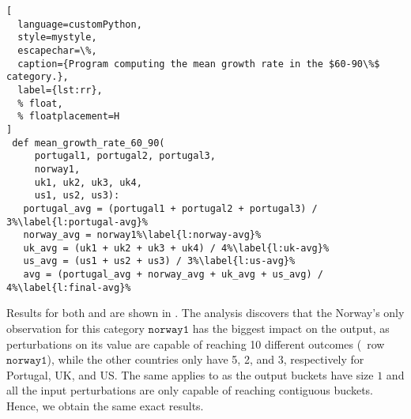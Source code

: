 \begin{lstlisting}[
  language=customPython,
  style=mystyle,
  escapechar=\%,
  caption={Program computing the mean growth rate in the $60-90\%$ category.},
  label={lst:rr},
  % float,
  % floatplacement=H
]
 def mean_growth_rate_60_90(
     portugal1, portugal2, portugal3,
     norway1,
     uk1, uk2, uk3, uk4,
     us1, us2, us3):
   portugal_avg = (portugal1 + portugal2 + portugal3) / 3%\label{l:portugal-avg}%
   norway_avg = norway1%\label{l:norway-avg}%
   uk_avg = (uk1 + uk2 + uk3 + uk4) / 4%\label{l:uk-avg}%
   us_avg = (us1 + us2 + us3) / 3%\label{l:us-avg}%
   avg = (portugal_avg + norway_avg + uk_avg + us_avg) / 4%\label{l:final-avg}%
\end{lstlisting}
%
%
\begin{margintable}
  \caption{Quantitative input usage for  from the Reinhart and Rogoff's article.}
  \centering
\end{margintable}
%
Results for both \outcomesname{} and \rangename{} are shown in .
The analysis discovers that the Norway's only observation for this category $\texttt{norway1}$ has the biggest impact on the output, as perturbations on its value are capable of reaching 10 different outcomes (\cf~row $\texttt{norway1}$), while the other countries only have 5, 2, and 3, respectively for Portugal, UK, and US.
The same applies to \rangename{} as the output buckets have size $1$ and all the input perturbations are only capable of reaching contiguous buckets. Hence, we obtain the same exact results.

